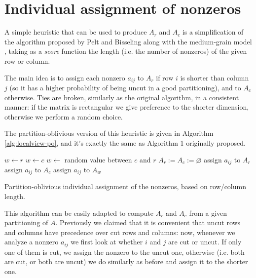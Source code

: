 \section{Individual assignment of nonzeros} \label{sec:localview}

A simple heuristic that can be used to produce $A_r$ and $A_c$ is a simplification of the algorithm proposed by Pelt and Bisseling along with the medium-grain model \cite[Alg.~1]{mediumgrain}, taking as a \emph{score} function the length (i.e. the number of nonzeros) of the given row or column.

The main idea is to assign each nonzero $a_{ij}$ to $A_r$ if row $i$ is shorter than column $j$ (so it has a higher probability of being uncut in a good partitioning), and to $A_c$ otherwise. Ties are broken, similarly as the original algorithm, in a consistent manner: if the matrix is rectangular we give preference to the shorter dimension, otherwise we perform a random choice.

The partition-oblivious version of this heuristic is given in Algorithm \ref{alg:localview-po}, and it's exactly the same as Algorithm 1 originally proposed.

\begin{algorithm}[h]
	\begin{algorithmic}
		\State
		\State $w \gets r$ 
		\State $w \gets c$
		\Else
		\State $w \gets$ random value between $c$ and $r$
		\EndIf
		\State $A_r := A_c := \varnothing$
		\State assign $a_{ij}$ to $A_r$
		\State assign $a_{ij}$ to $A_c$
		\Else
		\State assign $a_{ij}$ to $A_w$
		\EndIf
		\EndFor
	\end{algorithmic}
	\caption{Partition-oblivious individual assignment of the nonzeros, based on row/column length.} \label{alg:localview-po}
\end{algorithm}

This algorithm can be easily adapted to compute $A_r$ and $A_c$ from a given partitioning of $A$. Previously we claimed that it is convenient that uncut rows and columns have precedence over cut rows and columns: now, whenever we analyze a nonzero $a_{ij}$ we first look at whether $i$ and $j$ are cut or uncut. If only one of them is cut, we assign the nonzero to the uncut one, otherwise (i.e. both are cut, or both are uncut) we do similarly as before and assign it to the shorter one.

